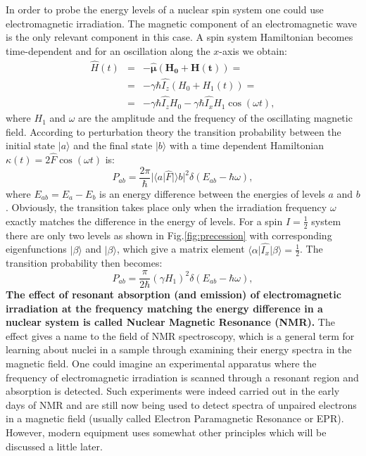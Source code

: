 \documentclass[a4paper, 12pt]{article}
\begin{document}
 In order to probe the energy levels of a nuclear spin system one could use electromagnetic irradiation. The magnetic component of an electromagnetic wave is the only relevant component in this case. A spin system Hamiltonian becomes time-dependent and for an oscillation along the $x$-axis we obtain:
\begin{equation} \label{eq:oscillating_field}
\begin{array}{lcl}
\hat{H}(t) &=& -\bm{\hat{\mu}} \bm{(H_0+H(t))}=  \\
 &=& -\gamma \hbar \hat{I_z} (H_0 + H_1(t)) =\\
 &=&-\gamma \hbar \hat{I_z} H_0  -\gamma \hbar \hat{I_x} H_1 \cos(\omega t),
\end{array}
\end{equation}
where $H_1$ and $\omega$ are the amplitude and the frequency of the oscillating magnetic field. According to perturbation theory the transition probability between the initial state $\vert a \rangle$ and the final state $\vert b \rangle$ with a time dependent Hamiltonian $ \kappa (t) = 2 \hat{F} \cos (\omega t ) $ is:
\begin{equation} \label{eq:probability}
P_{ab} = \frac{2 \pi}{\hbar} \vert \langle a \vert \hat{F} \vert \rangle b \vert ^2 \delta(E_{ab}-\hbar \omega),
\end{equation}
where $E_{ab} = E_a - E_b$ is an energy difference between the energies of levels $a$ and $b$. Obviously, the transition takes place only when the irradiation frequency $\omega$ exactly matches the difference in the energy of levels. For a spin $I = \frac{1}{2}$ system there are only two levels as shown in Fig.\ref{fig:precession} with corresponding eigenfunctions $\vert \beta \rangle$ and $\vert \beta \rangle$, which give a matrix element $\langle \alpha\vert \hat{I_x} \vert \beta \rangle = \frac{1}{2}$. The transition probability then becomes:
\begin{equation}
P_{ab} = \frac{\pi}{2\hbar} (\gamma H_1)^2 \delta(E_{ab}-\hbar \omega),
\end{equation}
 \textbf{The effect of resonant absorption (and emission) of electromagnetic irradiation at the frequency matching the energy difference in a nuclear system is called Nuclear Magnetic Resonance (NMR).} The effect gives a name to the field of NMR spectroscopy, which is a general term for learning about nuclei in a sample through examining their energy spectra in the magnetic field. One could imagine an experimental apparatus where the frequency of electromagnetic irradiation  is scanned through a resonant region and absorption is detected. Such experiments were indeed carried out in the early days of NMR and are still now being used to detect spectra of unpaired electrons in a magnetic field (usually called Electron Paramagnetic Resonance or EPR). However, modern equipment uses somewhat other principles which will be discussed a little later.
\end{document}
